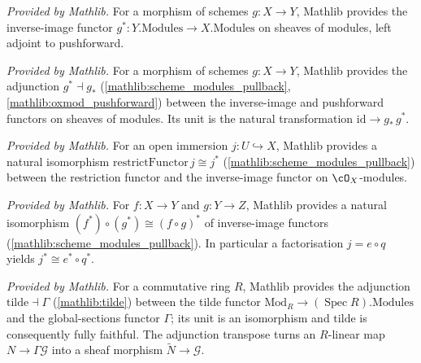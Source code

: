 \begin{definition}
  \label{mathlib:scheme_modules_pullback}
  \mathlibok
  \textit{Provided by Mathlib.}
  For a morphism of schemes \(g:X\to Y\), Mathlib provides the inverse-image functor
  \(g^{*}:Y.\mathrm{Modules}\to X.\mathrm{Modules}\) on sheaves of modules, left
  adjoint to pushforward.
\end{definition}

\begin{lemma}
  \label{mathlib:pullbackPushforwardAdjunction}
  \mathlibok
  \textit{Provided by Mathlib.}
  For a morphism of schemes \(g:X\to Y\), Mathlib provides the adjunction
  \(g^{*}\dashv g_{*}\) (\cref{mathlib:scheme_modules_pullback},
  \cref{mathlib:oxmod_pushforward}) between the inverse-image and pushforward
  functors on sheaves of modules.  Its unit is the natural transformation
  \(\mathrm{id}\to g_{*}\,g^{*}\).
\end{lemma}

\begin{lemma}
  \label{mathlib:restrictFunctorIsoPullback}
  \mathlibok
  \textit{Provided by Mathlib.}
  For an open immersion \(j:U\hookrightarrow X\), Mathlib provides a natural
  isomorphism \(\mathrm{restrictFunctor}\,j\cong j^{*}\)
  (\cref{mathlib:scheme_modules_pullback}) between the restriction functor and the
  inverse-image functor on \(\cO_X\)-modules.
\end{lemma}

\begin{lemma}
  \label{mathlib:pullbackComp}
  \mathlibok
  \textit{Provided by Mathlib.}
  For \(f:X\to Y\) and \(g:Y\to Z\), Mathlib provides a natural isomorphism
  \((f^{*})\circ(g^{*})\cong(f\circ g)^{*}\) of inverse-image functors
  (\cref{mathlib:scheme_modules_pullback}).  In particular a factorisation
  \(j=e\circ q\) yields \(j^{*}\cong e^{*}\circ q^{*}\).
\end{lemma}

\begin{lemma}
  \label{mathlib:tilde_adjunction}
  \mathlibok
  \textit{Provided by Mathlib.}
  For a commutative ring \(R\), Mathlib provides the adjunction
  \(\mathrm{tilde}\dashv\Gamma\) (\cref{mathlib:tilde}) between the tilde functor
  \(\mathrm{Mod}_R\to(\operatorname{Spec}R).\mathrm{Modules}\) and the
  global-sections functor \(\Gamma\); its unit is an isomorphism and
  \(\mathrm{tilde}\) is consequently fully faithful.  The adjunction transpose turns
  an \(R\)-linear map \(N\to\Gamma\mathcal G\) into a sheaf morphism
  \(\widetilde N\to\mathcal G\).
\end{lemma}

